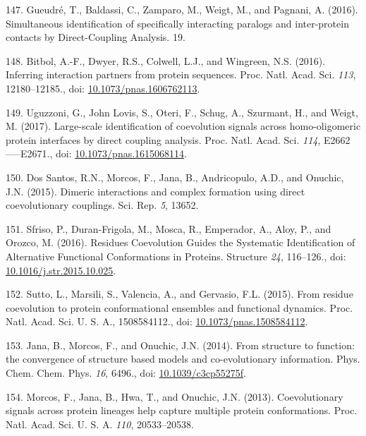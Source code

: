 \documentclass[11pt,a4paper,twoside]{book}
\theoremstyle{definition}
\theoremstyle{definition}
\theoremstyle{remark}
\begin{document}
\hypertarget{ref-Gueudre2016}{}
147. Gueudré, T., Baldassi, C., Zamparo, M., Weigt, M., and Pagnani, A.
(2016). Simultaneous identification of specifically interacting paralogs
and inter-protein contacts by Direct-Coupling Analysis. 19.

\hypertarget{ref-Bitbol2016}{}
148. Bitbol, A.-F., Dwyer, R.S., Colwell, L.J., and Wingreen, N.S.
(2016). Inferring interaction partners from protein sequences. Proc.
Natl. Acad. Sci. \emph{113}, 12180--12185., doi:
\href{https://doi.org/10.1073/pnas.1606762113}{10.1073/pnas.1606762113}.

\hypertarget{ref-Uguzzoni2017}{}
149. Uguzzoni, G., John Lovis, S., Oteri, F., Schug, A., Szurmant, H.,
and Weigt, M. (2017). Large-scale identification of coevolution signals
across homo-oligomeric protein interfaces by direct coupling analysis.
Proc. Natl. Acad. Sci. \emph{114}, E2662-----E2671., doi:
\href{https://doi.org/10.1073/pnas.1615068114}{10.1073/pnas.1615068114}.

\hypertarget{ref-DosSantos2015a}{}
150. Dos Santos, R.N., Morcos, F., Jana, B., Andricopulo, A.D., and
Onuchic, J.N. (2015). Dimeric interactions and complex formation using
direct coevolutionary couplings. Sci. Rep. \emph{5}, 13652.

\hypertarget{ref-Sfriso2016}{}
151. Sfriso, P., Duran-Frigola, M., Mosca, R., Emperador, A., Aloy, P.,
and Orozco, M. (2016). Residues Coevolution Guides the Systematic
Identification of Alternative Functional Conformations in Proteins.
Structure \emph{24}, 116--126., doi:
\href{https://doi.org/10.1016/j.str.2015.10.025}{10.1016/j.str.2015.10.025}.

\hypertarget{ref-Sutto2015}{}
152. Sutto, L., Marsili, S., Valencia, A., and Gervasio, F.L. (2015).
From residue coevolution to protein conformational ensembles and
functional dynamics. Proc. Natl. Acad. Sci. U. S. A., 1508584112., doi:
\href{https://doi.org/10.1073/pnas.1508584112}{10.1073/pnas.1508584112}.

\hypertarget{ref-Jana2014}{}
153. Jana, B., Morcos, F., and Onuchic, J.N. (2014). From structure to
function: the convergence of structure based models and co-evolutionary
information. Phys. Chem. Chem. Phys. \emph{16}, 6496., doi:
\href{https://doi.org/10.1039/c3cp55275f}{10.1039/c3cp55275f}.

\hypertarget{ref-Morcos2013a}{}
154. Morcos, F., Jana, B., Hwa, T., and Onuchic, J.N. (2013).
Coevolutionary signals across protein lineages help capture multiple
protein conformations. Proc. Natl. Acad. Sci. U. S. A. \emph{110},
20533--20538.
\end{document}
